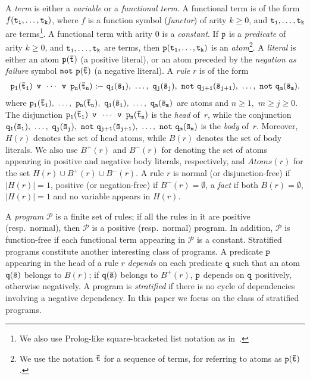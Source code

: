 \documentclass{tlp}
\newcommand{\Or}{\ensuremath{\mathtt{\,v\,}}\xspace}
\newcommand{\derives}{\ensuremath{\mathtt{\ :\!\!-}\ }}
\newcommand{\p}{\ensuremath{{\mathcal{P}}}}
\newcommand{\R}{\ensuremath{r}}
\newcommand{\HR}{\ensuremath{H(\R)}}
\newcommand{\BR}{\ensuremath{B(\R)}}
\newcommand{\naf}{\ensuremath{\mathtt{not}}\xspace}
\newcommand{\body}[1]{\ensuremath{B(#1)}}
\newcommand{\posbody}[1]{\ensuremath{B^+(#1)}}
\newcommand{\negbody}[1]{\ensuremath{B^-(#1)}}
\newcommand{\atoms}[1]{\ensuremath{Atoms(#1)}}
\newenvironment{dlvcode}
  {\begin{displaymath}\begin{array}{l}}
  {\end{array}\end{displaymath}}
\renewcommand{\P}{\mathcal{P}}
\renewcommand{\t}{\bar t}
\newcommand{\s}{\bar s}
\begin{document}
A \emph{term} is either a \emph{variable} or a \emph{functional
term}. 
A functional term is of the form $f\tt(t_1, \dots, t_k)$, where
$f$ is a function symbol ({\em functor}) of arity $k \ge 0$,
and $\tt t_1, \ldots, t_k$ are terms\footnote{We also use Prolog-like square-bracketed list notation
as in~\cite{cali-etal-2008-iclp}.}.
A functional term with arity 0 is a {\em constant}.
If $\tt p$ is a {\em predicate} of arity $k \geq 0$,
and $\tt t_1, \ldots, t_k$ are terms,
then $\tt p(t_1, \ldots, t_k)$ is an {\em atom}\footnote{We use the notation $\tt \t$ for a sequence
of terms, for referring to atoms as
$\tt p(\t)$.}. A {\em literal} is either an atom $\tt p(\t)$ (a positive literal),
or an atom preceded by the {\em negation as failure} symbol $\tt \naf~p(\t)$
(a negative literal).
A {\em rule} $\R$ is of the form
\begin{dlvcode}
\tt p_1(\t_1) \ \Or\ \cdots \ \Or\ p_n(\t_n) \derives 
    q_1(\s_1),\ \ldots,\ q_j(\s_j),\ \naf~q_{j+1}(\s_{j+1}),\ \ldots,\ \naf~q_m(\s_m).
\end{dlvcode}where $\tt p_1(\t_1),\ \ldots,\ p_n(\t_n),\ q_1(\s_1),\ \ldots,\ q_m(\s_m)$ 
are atoms and $n\geq 1,$  $m\geq j\geq 0$. The
disjunction $\tt p_1(\t_1) \ \Or\ \cdots \ \Or\ p_n(\t_n)$ is the {\em head} of~\R{}, 
while the conjunction 
$\tt q_1(\s_1),\ \ldots,\ q_j(\s_j),\ \naf~q_{j+1}(\s_{j+1}),\ \ldots,\ \naf~q_m(\s_m)$ 
is the {\em body} of~\R{}.
Moreover, $\HR$ denotes the set of head atoms, while $\BR$ denotes the set of body literals.
We also use $\posbody{\R}$ and $\negbody{\R}$ for denoting
the set of atoms appearing in positive and negative body literals, respectively,
and $\atoms{\R}$ for the set $\HR \cup \posbody{\R} \cup \negbody{\R}$.
A rule $\R$ is normal (or disjunction-free) if $|\HR| = 1$, 
positive (or negation-free) if $\negbody{\R}=\emptyset$,
a {\em fact} if both $\body{\R}=\emptyset$, $|\HR| = 1$ and no variable appears
in $\HR$.

A \emph{program}
$\P$ is a finite set of rules; if all the rules in it are positive (resp.\ normal), 
then $\P$ is a positive (resp.\ normal) program.
In addition, $\p$ is function-free if each functional term
appearing in $\p$ is a constant.
Stratified programs constitute another interesting class of 
programs. A predicate $\tt p$ appearing in the head of a rule $\R$
{\em depends} on each predicate $\tt q$ such that an atom $\tt q(\s)$ belongs to $\BR$; 
if $\tt q(\s)$ belongs to $\posbody{\R}$, $\tt p$ depends on $\tt q$ positively, otherwise negatively. 
A program is \emph{stratified} if there is no cycle of dependencies involving a
negative dependency.
In this paper we focus on the class of stratified programs.
\end{document}
